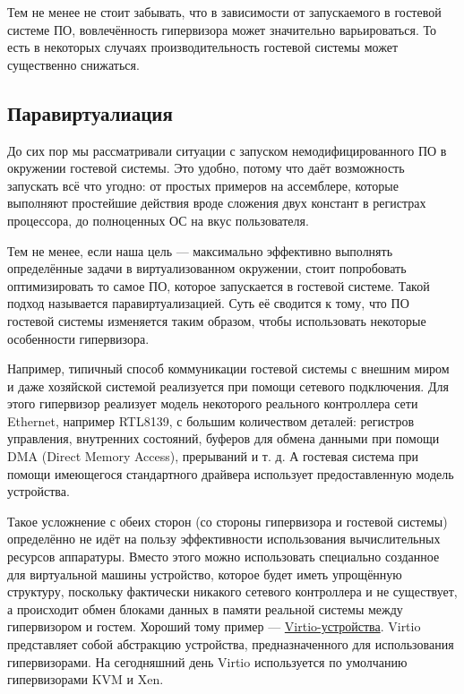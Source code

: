 \documentclass[14pt, a4paper]{article}
\begin{document}
Тем не менее не стоит забывать, что в зависимости от запускаемого в гостевой системе ПО,
вовлечённость гипервизора может значительно варьироваться. То есть в некоторых случаях
производительность гостевой системы может существенно снижаться.\\

\subsection*{Паравиртуалиация}

До сих пор мы рассматривали ситуации с запуском немодифицированного ПО в окружении гостевой
системы. Это удобно, потому что даёт возможность запускать всё что угодно: от простых примеров на
ассемблере, которые выполняют простейшие действия вроде сложения двух констант в регистрах
процессора, до полноценных ОС на вкус пользователя.

Тем не менее, если наша цель — максимально эффективно выполнять определённые задачи в
виртуализованном окружении, стоит попробовать оптимизировать то самое ПО, которое запускается в
гостевой системе. Такой подход называется паравиртуализацией. Суть её сводится к тому, что ПО
гостевой системы изменяется таким образом, чтобы использовать некоторые особенности
гипервизора.

Например, типичный способ коммуникации гостевой системы с внешним миром и даже хозяйской
системой реализуется при помощи сетевого подключения. Для этого гипервизор реализует модель
некоторого реального контроллера сети Ethernet, например RTL8139, с большим количеством
деталей: регистров управления, внутренних состояний, буферов для обмена данными при помощи
DMA (Direct Memory Access), прерываний и т. д. А гостевая система при помощи имеющегося
стандартного драйвера использует предоставленную модель устройства.

Такое усложнение с обеих сторон (со стороны гипервизора и гостевой системы) определённо не идёт
на пользу эффективности использования вычислительных ресурсов аппаратуры. Вместо этого можно
использовать специально созданное для виртуальной машины устройство, которое будет иметь
упрощённую структуру, поскольку фактически никакого сетевого контроллера и не существует, а
происходит обмен блоками данных в памяти реальной системы между гипервизором и гостем.
Хороший тому пример — \href{https://developer.ibm.com/articles/l-virtio/}{Virtio-устройства}. 
Virtio представляет собой абстракцию устройства,
предназначенного для использования гипервизорами. На сегодняшний день Virtio используется по
умолчанию гипервизорами KVM и Xen.
\end{document}
